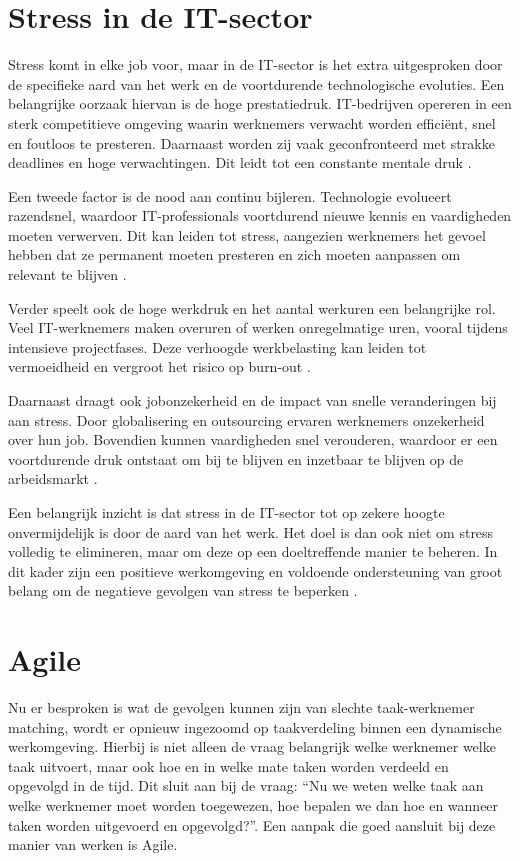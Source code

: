 \section{Stress in de IT-sector}
\label{ch:stress-in-de-IT-sector} 
\vspace{1em}Stress komt in elke job voor, maar in de IT-sector is het extra uitgesproken door de specifieke aard van het werk en de voortdurende technologische evoluties. Een belangrijke oorzaak hiervan is de hoge prestatiedruk. IT-bedrijven opereren in een sterk competitieve omgeving waarin werknemers verwacht worden efficiënt, snel en foutloos te presteren. Daarnaast worden zij vaak geconfronteerd met strakke deadlines en hoge verwachtingen. Dit leidt tot een constante mentale druk \autocite{Iswarya_2024}.

Een tweede factor is de nood aan continu bijleren. Technologie evolueert razendsnel, waardoor IT-professionals voortdurend nieuwe kennis en vaardigheden moeten verwerven. Dit kan leiden tot stress, aangezien werknemers het gevoel hebben dat ze permanent moeten presteren en zich moeten aanpassen om relevant te blijven \autocite{Iswarya_2024}.

Verder speelt ook de hoge werkdruk en het aantal werkuren een belangrijke rol. Veel IT-werknemers maken overuren of werken onregelmatige uren, vooral tijdens intensieve projectfases. Deze verhoogde werkbelasting kan leiden tot vermoeidheid en vergroot het risico op burn-out \autocite{Iswarya_2024}.

Daarnaast draagt ook jobonzekerheid en de impact van snelle veranderingen bij aan stress. Door globalisering en outsourcing ervaren werknemers onzekerheid over hun job. Bovendien kunnen vaardigheden snel verouderen, waardoor er een voortdurende druk ontstaat om bij te blijven en inzetbaar te blijven op de arbeidsmarkt \autocite{Iswarya_2024}.

\vspace{1em}Een belangrijk inzicht is dat stress in de IT-sector tot op zekere hoogte onvermijdelijk is door de aard van het werk. Het doel is dan ook niet om stress volledig te elimineren, maar om deze op een doeltreffende manier te beheren. In dit kader zijn een positieve werkomgeving en voldoende ondersteuning van groot belang om de negatieve gevolgen van stress te beperken \autocite{Iswarya_2024}.

\section{Agile}
\label{ch:agile} 
\vspace{1em}Nu er besproken is wat de gevolgen kunnen zijn van slechte taak-werknemer matching, wordt er opnieuw ingezoomd op taakverdeling binnen een dynamische werkomgeving. Hierbij is niet alleen de vraag belangrijk welke werknemer welke taak uitvoert, maar ook hoe en in welke mate taken worden verdeeld en opgevolgd in de tijd. Dit sluit aan bij de vraag: ``Nu we weten welke taak aan welke werknemer moet worden toegewezen, hoe bepalen we dan hoe en wanneer taken worden uitgevoerd en opgevolgd?''. Een aanpak die goed aansluit bij deze manier van werken is Agile.

